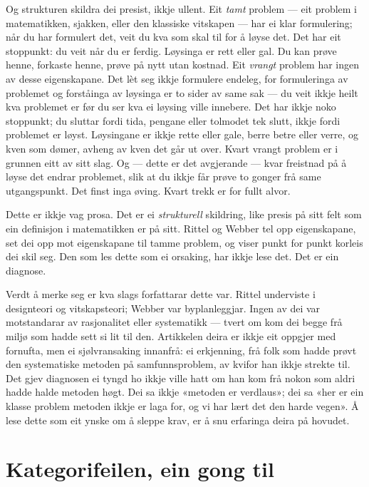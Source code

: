 Og strukturen skildra dei presist, ikkje ullent. Eit \emph{tamt} problem — eit problem i matematikken, sjakken, eller den klassiske vitskapen — har ei klar formulering; når du har formulert det, veit du kva som skal til for å løyse det. Det har eit stoppunkt: du veit når du er ferdig. Løysinga er rett eller gal. Du kan prøve henne, forkaste henne, prøve på nytt utan kostnad. Eit \emph{vrangt} problem har ingen av desse eigenskapane. Det lèt seg ikkje formulere endeleg, for formuleringa av problemet og forståinga av løysinga er to sider av same sak — du veit ikkje heilt kva problemet er før du ser kva ei løysing ville innebere. Det har ikkje noko stoppunkt; du sluttar fordi tida, pengane eller tolmodet tek slutt, ikkje fordi problemet er løyst. Løysingane er ikkje rette eller gale, berre betre eller verre, og kven som dømer, avheng av kven det går ut over. Kvart vrangt problem er i grunnen eitt av sitt slag. Og — dette er det avgjerande — kvar freistnad på å løyse det endrar problemet, slik at du ikkje får prøve to gonger frå same utgangspunkt. Det finst inga øving. Kvart trekk er for fullt alvor.

Dette er ikkje vag prosa. Det er ei \emph{strukturell} skildring, like presis på sitt felt som ein definisjon i matematikken er på sitt. Rittel og Webber tel opp eigenskapane, set dei opp mot eigenskapane til tamme problem, og viser punkt for punkt korleis dei skil seg. Den som les dette som ei orsaking, har ikkje lese det. Det er ein diagnose.

Verdt å merke seg er kva slags forfattarar dette var. Rittel underviste i designteori og vitskapsteori; Webber var byplanleggjar. Ingen av dei var motstandarar av rasjonalitet eller systematikk — tvert om kom dei begge frå miljø som hadde sett si lit til den. Artikkelen deira er ikkje eit oppgjer med fornufta, men ei sjølvransaking innanfrå: ei erkjenning, frå folk som hadde prøvt den systematiske metoden på samfunnsproblem, av kvifor han ikkje strekte til. Det gjev diagnosen ei tyngd ho ikkje ville hatt om han kom frå nokon som aldri hadde halde metoden høgt. Dei sa ikkje «metoden er verdlaus»; dei sa «her er ein klasse problem metoden ikkje er laga for, og vi har lært det den harde vegen». Å lese dette som eit ynske om å sleppe krav, er å snu erfaringa deira på hovudet.

\section{Kategorifeilen, ein gong til}

